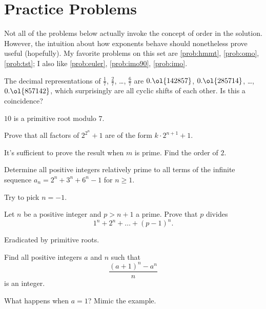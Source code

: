 \documentclass[11pt]{scrartcl}
\begin{document}
\section{Practice Problems}
Not all of the problems below actually invoke the concept of order in the solution.
However, the intuition about how exponents behave should nonetheless prove useful (hopefully).
My favorite problems on this set are \ref{prob:hmmt}, \ref{prob:omo}, \ref{prob:tst};
I also like \ref{prob:euler}, \ref{prob:imo90}, \ref{prob:imo}.

\begin{problem}
  The decimal representations of $\frac17$, $\frac27$, \dots, $\frac67$ are
  $0.\ol{142857}$, $0.\ol{285714}$, \dots, $0.\ol{857142}$, which surprisingly are
  all cyclic shifts of each other.
  Is this a coincidence?
  \begin{hint}
    $10$ is a primitive root modulo $7$.
  \end{hint}
\end{problem}

\begin{problem}
  [Euler]
  \label{prob:euler}
  Prove that all factors of $2^{2^n}+1$ are of the form $k \cdot 2^{n+1}+1$.
  \begin{hint}
    It's sufficient to prove the result when $m$ is prime.
    Find the order of $2$.
  \end{hint}
\end{problem}

\begin{problem}
  [IMO 2005/4]
  Determine all positive integers relatively prime to all terms of the infinite sequence $a_n = 2^n+3^n+6^n-1$ for $n \ge 1$.
  \begin{hint}
    Try to pick $n=-1$.
  \end{hint}
\end{problem}

\begin{problem}
  Let $n$ be a positive integer and $p > n+1$ a prime.
  Prove that $p$ divides
  \[ 1^n+2^n+ \dots + (p-1)^n. \]
  \begin{hint}
    Eradicated by primitive roots.
  \end{hint}
\end{problem}

\begin{problem}
  \label{prob:china}
  Find all positive integers $a$ and $n$ such that
  \[ \frac{(a+1)^n-a^n}{n} \]
  is an integer.
  \begin{hint}
    What happens when $a=1$? Mimic the example.
  \end{hint}
\end{problem}
\end{document}
